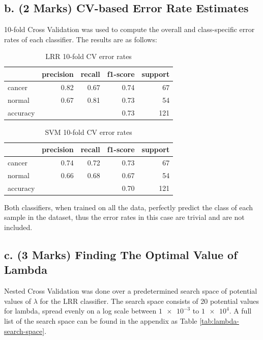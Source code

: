 \documentclass[twocolumn]{article}
\begin{document}
\subsection{b. (2 Marks) CV-based Error Rate Estimates}
10-fold Cross Validation was used to compute the overall and class-specific error rates of each classifier. The results are as follows:

\begin{table}[H]
    \centering
    \begin{tabular}{lrrrr}
    \toprule
     & precision & recall & f1-score & support \\
    \midrule
    cancer & 0.82 & 0.67 & 0.74 & 67 \\
    normal & 0.67 & 0.81 & 0.73 & 54 \\
    accuracy & & & 0.73 & 121 \\
    \bottomrule
    \end{tabular}
    \caption{LRR 10-fold CV error rates}
    \label{tab:errors-lrr}
\end{table}

\begin{table}[H]
    \centering
    \begin{tabular}{lrrrr}
    \toprule
     & precision & recall & f1-score & support \\
    \midrule
    cancer & 0.74 & 0.72 & 0.73 & 67\\
    normal & 0.66 & 0.68 & 0.67 & 54\\
    accuracy & & & 0.70 & 121 \\
    \bottomrule
    \end{tabular}
    \caption{SVM 10-fold CV error rates}
    \label{tab:errors-svm}
\end{table}

Both classifiers, when trained on all the data, perfectly predict the class of each sample in the dataset, thus the error rates in this case are trivial and are not included.

\subsection{c. (3 Marks) Finding The Optimal Value of Lambda}
Nested Cross Validation was done over a predetermined search space of potential values of $\lambda$ for the LRR classifier. The search space consists of 20 potential values for lambda, spread evenly on a log scale between $\num{1e-3}$ to $\num{1e4}$. A full list of the search space can be found in the appendix as Table \ref{tab:lambda-search-space}. 
\end{document}
